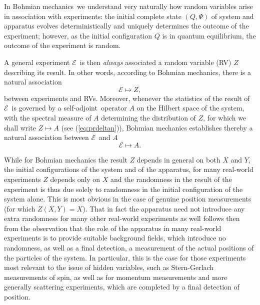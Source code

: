 \documentclass[12pt]{article}
\newcommand{\eq}[1]{(\ref{#1})}
\newcommand{\sa}{self-adjoint}
\newcommand{\BM}{Bohmian mechanics}
\newcommand{\E}{\mbox{$\mathscr{E}$}}
\newcommand{\EE}{\mathscr{E}}
\begin{document}
In \BM\ we understand very naturally how random variables arise in
association with experiments: the initial complete state $(Q, \Psi)$
of system and apparatus evolves deterministically and uniquely
determines the outcome of the experiment; however, as the initial
configuration $Q$ is in quantum equilibrium, the outcome of the
experiment is random.

A general experiment \E\ is then {\it always} associated a random
variable (RV) $Z$ describing its result. In other words, according to
\BM, there is a natural association
\begin{equation}\label{extrv}  \EE \mapsto  {Z}, \end{equation}
between experiments and RVs.  Moreover, whenever the statistics of the
result of \E\ is governed by a \sa\ operator $A$ on the Hilbert space
of the system, with the spectral measure of $A$ determining the
distribution of $Z$, for which we shall write $Z\mapsto A$ (see
\eq{eq:prdeltan}), \BM{} establishes thereby a natural association
between \E\ and $A$
\begin{equation}\label{extop}  \E \mapsto A . \end{equation}



While for Bohmian mechanics the result $Z$ depends in general on both
$X$ and $Y$, the initial configurations of the system and of the
apparatus, for many real-world experiments $Z$ depends only on $X$ and
the randomness in the result of the experiment is thus due solely to
randomness in the initial configuration of the system alone.  This is
most obvious in the case of genuine position measurements (for which
$Z(X,Y)= X$).  That in fact the apparatus need not introduce any extra
randomness for many other real-world experiments as well follows then
{}from the observation that the role of the apparatus in many
real-world experiments is to provide suitable background fields, which
introduce no randomness, as well as a final detection, a measurement
of the actual positions of the particles of the system.  In
particular, this is the case for those experiments most relevant to
the issue of hidden variables, such as Stern-Gerlach measurements of
spin, as well as for momentum measurements and more generally
scattering experiments, which are completed by a final detection of
position.
\end{document}
